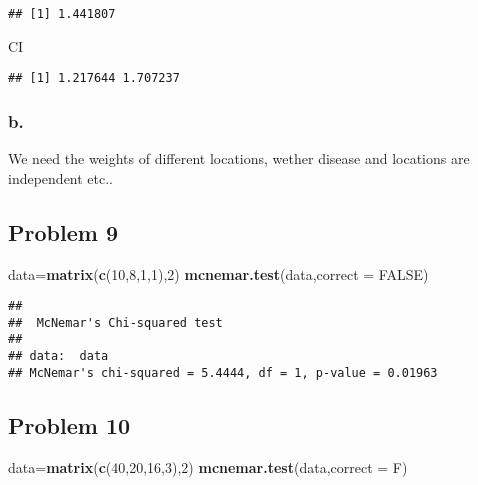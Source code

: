 \documentclass[]{article}
\newenvironment{Shaded}{\begin{snugshade}}{\end{snugshade}}
\newcommand{\KeywordTok}[1]{\textcolor[rgb]{0.13,0.29,0.53}{\textbf{#1}}}
\newcommand{\DataTypeTok}[1]{\textcolor[rgb]{0.13,0.29,0.53}{#1}}
\newcommand{\DecValTok}[1]{\textcolor[rgb]{0.00,0.00,0.81}{#1}}
\newcommand{\OtherTok}[1]{\textcolor[rgb]{0.56,0.35,0.01}{#1}}
\newcommand{\NormalTok}[1]{#1}
\begin{document}
\begin{verbatim}
## [1] 1.441807
\end{verbatim}

\begin{Shaded}
\begin{Highlighting}[]
\NormalTok{CI}
\end{Highlighting}
\end{Shaded}

\begin{verbatim}
## [1] 1.217644 1.707237
\end{verbatim}

\subsubsection{b.}\label{b.-3}

We need the weights of different locations, wether disease and locations
are independent etc..

\subsection{Problem 9}\label{problem-9}

\begin{Shaded}
\begin{Highlighting}[]
\NormalTok{data=}\KeywordTok{matrix}\NormalTok{(}\KeywordTok{c}\NormalTok{(}\DecValTok{10}\NormalTok{,}\DecValTok{8}\NormalTok{,}\DecValTok{1}\NormalTok{,}\DecValTok{1}\NormalTok{),}\DecValTok{2}\NormalTok{)}
\KeywordTok{mcnemar.test}\NormalTok{(data,}\DataTypeTok{correct =} \OtherTok{FALSE}\NormalTok{)}
\end{Highlighting}
\end{Shaded}

\begin{verbatim}
## 
##  McNemar's Chi-squared test
## 
## data:  data
## McNemar's chi-squared = 5.4444, df = 1, p-value = 0.01963
\end{verbatim}

\subsection{Problem 10}\label{problem-10}

\begin{Shaded}
\begin{Highlighting}[]
\NormalTok{data=}\KeywordTok{matrix}\NormalTok{(}\KeywordTok{c}\NormalTok{(}\DecValTok{40}\NormalTok{,}\DecValTok{20}\NormalTok{,}\DecValTok{16}\NormalTok{,}\DecValTok{3}\NormalTok{),}\DecValTok{2}\NormalTok{)}
\KeywordTok{mcnemar.test}\NormalTok{(data,}\DataTypeTok{correct =}\NormalTok{ F)}
\end{Highlighting}
\end{Shaded}
\end{document}
